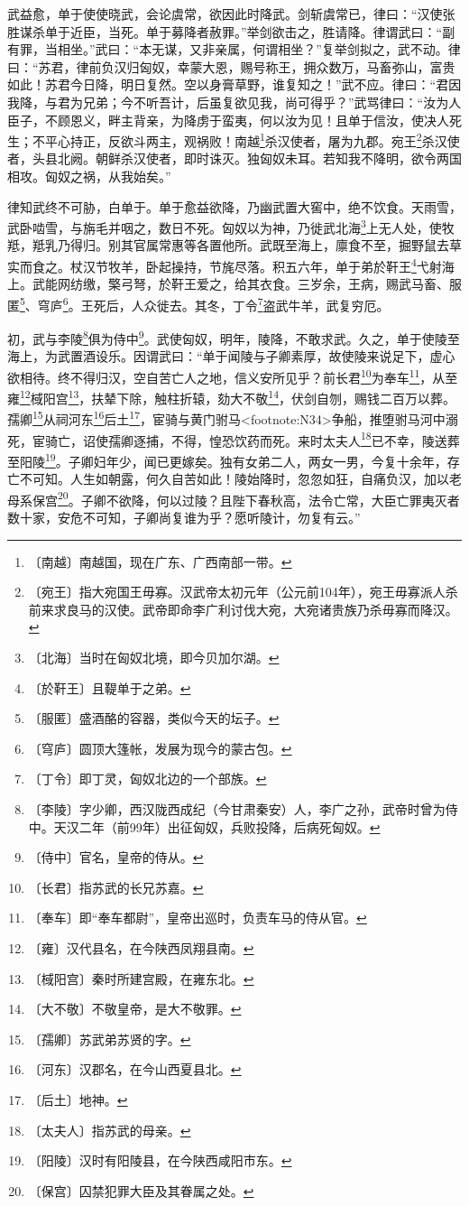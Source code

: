 \documentclass[12pt,UTF-8,openany]{ctexbook}
\begin{document}
\begin{normalsize}
    武益愈，单于使使晓武，会论虞常，欲因此时降武。剑斩虞常已，律曰：“汉使张胜谋杀单于近臣，当死。单于募降者赦罪。”举剑欲击之，胜请降。律谓武曰：“副有罪，当相坐。”武曰：“本无谋，又非亲属，何谓相坐？”复举剑拟之，武不动。律曰：“苏君，律前负汉归匈奴，幸蒙大恩，赐号称王，拥众数万，马畜弥山，富贵如此！苏君今日降，明日复然。空以身膏草野，谁复知之！”武不应。律曰：“君因我降，与君为兄弟；今不听吾计，后虽复欲见我，尚可得乎？”武骂律曰：“汝为人臣子，不顾恩义，畔主背亲，为降虏于蛮夷，何以汝为见！且单于信汝，使决人死生；不平心持正，反欲斗两主，观祸败！南越\footnote{〔南越〕南越国，现在广东、广西南部一带。}杀汉使者，屠为九郡。宛王\footnote{〔宛王〕指大宛国王毋寡。汉武帝太初元年（公元前104年），宛王毋寡派人杀前来求良马的汉使。武帝即命李广利讨伐大宛，大宛诸贵族乃杀毋寡而降汉。}杀汉使者，头县北阙。朝鲜杀汉使者，即时诛灭。独匈奴未耳。若知我不降明，欲令两国相攻。匈奴之祸，从我始矣。”
    
    律知武终不可胁，白单于。单于愈益欲降，乃幽武置大窖中，绝不饮食。天雨雪，武卧啮雪，与旃毛并咽之，数日不死。匈奴以为神，乃徙武北海\footnote{〔北海〕当时在匈奴北境，即今贝加尔湖。}上无人处，使牧羝，羝乳乃得归。别其官属常惠等各置他所。武既至海上，廪食不至，掘野鼠去草实而食之。杖汉节牧羊，卧起操持，节旄尽落。积五六年，单于弟於靬王\footnote{〔於靬王〕且鞮单于之弟。}弋射海上。武能网纺缴，檠弓弩，於靬王爱之，给其衣食。三岁余，王病，赐武马畜、服匿\footnote{〔服匿〕盛酒酪的容器，类似今天的坛子。}、穹庐\footnote{〔穹庐〕圆顶大篷帐，发展为现今的蒙古包。}。王死后，人众徙去。其冬，丁令\footnote{〔丁令〕即丁灵，匈奴北边的一个部族。}盗武牛羊，武复穷厄。
    
    初，武与李陵\footnote{〔李陵〕字少卿，西汉陇西成纪（今甘肃秦安）人，李广之孙，武帝时曾为侍中。天汉二年（前99年）出征匈奴，兵败投降，后病死匈奴。}俱为侍中\footnote{〔侍中〕官名，皇帝的侍从。}。武使匈奴，明年，陵降，不敢求武。久之，单于使陵至海上，为武置酒设乐。因谓武曰：“单于闻陵与子卿素厚，故使陵来说足下，虚心欲相待。终不得归汉，空自苦亡人之地，信义安所见乎？前长君\footnote{〔长君〕指苏武的长兄苏嘉。}为奉车\footnote{〔奉车〕即“奉车都尉”，皇帝出巡时，负责车马的侍从官。}，从至雍\footnote{〔雍〕汉代县名，在今陕西凤翔县南。}棫阳宫\footnote{〔棫阳宫〕秦时所建宫殿，在雍东北。}，扶辇下除，触柱折辕，劾大不敬\footnote{〔大不敬〕不敬皇帝，是大不敬罪。}，伏剑自刎，赐钱二百万以葬。孺卿\footnote{〔孺卿〕苏武弟苏贤的字。}从祠河东\footnote{〔河东〕汉郡名，在今山西夏县北。}后土\footnote{〔后土〕地神。}，宦骑与黄门驸马<footnote:N34>争船，推堕驸马河中溺死，宦骑亡，诏使孺卿逐捕，不得，惶恐饮药而死。来时太夫人\footnote{〔太夫人〕指苏武的母亲。}已不幸，陵送葬至阳陵\footnote{〔阳陵〕汉时有阳陵县，在今陕西咸阳市东。}。子卿妇年少，闻已更嫁矣。独有女弟二人，两女一男，今复十余年，存亡不可知。人生如朝露，何久自苦如此！陵始降时，忽忽如狂，自痛负汉，加以老母系保宫\footnote{〔保宫〕囚禁犯罪大臣及其眷属之处。}。子卿不欲降，何以过陵？且陛下春秋高，法令亡常，大臣亡罪夷灭者数十家，安危不可知，子卿尚复谁为乎？愿听陵计，勿复有云。”
    

\end{normalsize}
\end{document}

